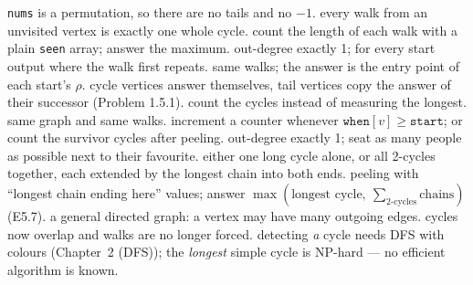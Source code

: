 \begin{variantsbox}
  {\texttt{nums} is a permutation, so there are no tails and no $-1$.}
  {every walk from an unvisited vertex is exactly one whole cycle.}
  {count the length of each walk with a plain \texttt{seen} array; answer the maximum.}
  {out-degree exactly 1; for every start output where the walk first repeats.}
  {same walks; the answer is the entry point of each start's $\rho$.}
  {cycle vertices answer themselves, tail vertices copy the answer of their successor (Problem 1.5.1).}
  {count the cycles instead of measuring the longest.}
  {same graph and same walks.}
  {increment a counter whenever $\texttt{when}[v] \ge \texttt{start}$; or count the survivor cycles after peeling.}
  {out-degree exactly 1; seat as many people as possible next to their favourite.}
  {either one long cycle alone, or all 2-cycles together, each extended by the longest chain into both ends.}
  {peeling with ``longest chain ending here'' values; answer $\max(\text{longest cycle},\ \sum_{2\text{-cycles}} \text{chains})$ (E5.7).}
  {a general directed graph: a vertex may have many outgoing edges.}
  {cycles now overlap and walks are no longer forced.}
  {detecting \emph{a} cycle needs DFS with colours (Chapter~2 (DFS)); the \emph{longest} simple cycle is NP-hard --- no efficient algorithm is known.}
\end{variantsbox}
